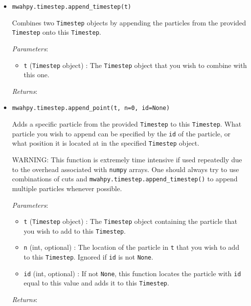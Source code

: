 \documentclass{article}
\begin{document}
\begin{itemize}



\item \verb!mwahpy.timestep.append_timestep(t)!

Combines two \verb!Timestep! objects by appending the particles from the provided \verb!Timestep! onto this \verb!Timestep!.

\textit{Parameters}: \begin{itemize}

\item \verb!t! (\verb!Timestep! object) : The \verb!Timestep! object that you wish to combine with this one.

\end{itemize}

\textit{Returns}:



\item \verb!mwahpy.timestep.append_point(t, n=0, id=None)!

Adds a specific particle from the provided \verb!Timestep! to this \verb!Timestep!. What particle you wish to append can be specified by the \verb!id! of the particle, or what position it is located at in the specified \verb!Timestep! object.

WARNING: This function is extremely time intensive if used repeatedly due to the overhead associated with \verb!numpy! arrays. One should always try to use combinations of cuts and \verb!mwahpy.timestep.append_timestep()! to append multiple particles whenever possible.

\textit{Parameters}: \begin{itemize}

\item \verb!t! (\verb!Timestep! object) : The \verb!Timestep! object containing the particle that you wish to add to this \verb!Timestep!.

\item \verb!n! (int, optional) : The location of the particle in \verb!t! that you wish to add to this \verb!Timestep!. Ignored if \verb!id! is not \verb!None!.

\item \verb!id! (int, optional) : If not \verb!None!, this function locates the particle with \verb!id! equal to this value and adds it to this \verb!Timestep!.

\end{itemize}

\textit{Returns}:




\end{itemize}
\end{document}
